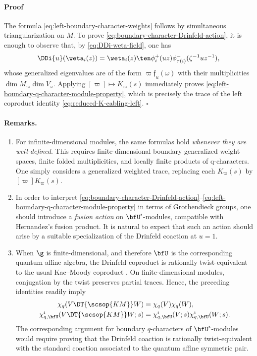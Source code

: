 \documentclass[reqno]{amsart}
\numberwithin{equation}{section}
\newenvironment{pf}{\medskip\paragraph{{\sc Proof}}}{\hfill$\square$\par\medskip}
\newenvironment{remarks}{\medskip\paragraph{{\bf Remarks.} }}{\par\medskip}
\begin{document}
\begin{pf}
The formula \eqref{eq:left-boundary-character-weights} follows by
simultaneous triangularization on $M$. To prove \eqref{eq:boundary-character-Drinfeld-action},
it is enough to observe that, by \eqref{eq:DDi-weta-field}, one has
\[
\DDi{u}(\weta_i(z))=\weta_i(z)\ten
\phi_i^+(uz)\phi_{\tau(i)}^-(\zeta^{-1}uz^{-1}),
\]
whose generalized eigenvalues are of the form $\varpi\mathfrak f_u(\omega)$ with
their multiplicities  $\dim M_\varpi\dim V_\omega$.
Applying $[\varpi]\mapsto K_\varpi(s)$ immediately proves
\eqref{eq:left-boundary-q-character-module-property}, which is
precisely the trace of the left coproduct identity
\eqref{eq:reduced-K-cabling-left}.
\end{pf}

\begin{remarks}
\hfill
\begin{enumerate}[leftmargin=2em]\itemsep0.25cm
\item 
For infinite-dimensional modules, the same formulas hold
\emph{whenever they are well-defined}. This requires finite-dimensional
boundary generalized weight spaces, finite folded multiplicities, and locally
finite products of q-characters. One simply considers a generalized weighted trace, replacing
each $K_\varpi(s)$ by $[\varpi]K_\varpi(s)$.

\item
In order to interpret 
\eqref{eq:boundary-character-Drinfeld-action}--\eqref{eq:left-boundary-q-character-module-property} 
in terms of Grothendieck groups, one should introduce a \emph{fusion action} on $\bfU^\imath$-modules, compatible with Hernandez's fusion product. It is natural to expect that such an action should arise 
by a suitable specialization of the Drinfeld coaction at $u=1$.

\item \label{rmk:boundary-finite-type}
When $\g$ is finite-dimensional, and therefore $\bfU$ is the corresponding quantum affine algebra, 
the Drinfeld coproduct is rationally twist-equivalent to the usual Kac--Moody coproduct
\cite[Sec.~3]{enriquez-khoroshkin-pakuliak-07}.
On finite-dimensional modules, conjugation by the twist preserves
partial traces. Hence, the preceding identities readily imply
\[
\begin{aligned}
\chi_q(V\DT{\scsop{KM}}W)&=\chi_q(V)\chi_q(W),\\
\chi^\imath_{q,\bfU}(V\DT{\scsop{KM}}W;s)
&=\chi^\imath_{q,\bfU}(V;s)\chi^\imath_{q,\bfU}(W;s).
\end{aligned}
\]
The corresponding argument for boundary $q$-characters of $\bfU^\imath$-modules would require proving that
the Drinfeld coaction is rationally twist-equivalent with the standard coaction associated to the
quantum affine symmetric pair.
\hfill\rmkend
\end{enumerate}
\end{remarks}
\end{document}
